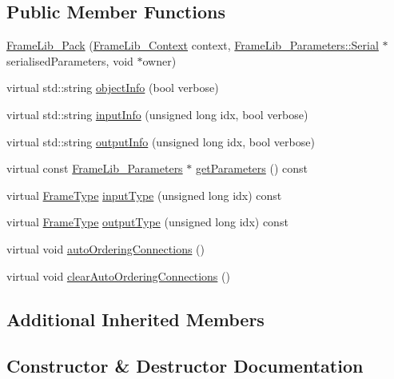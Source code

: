 \subsection*{Public Member Functions}
\begin{DoxyCompactItemize}
\item 
\hyperlink{class_frame_lib___pack_aded2a9815261f73a8231f5df6c647ac2}{Frame\+Lib\+\_\+\+Pack} (\hyperlink{class_frame_lib___context}{Frame\+Lib\+\_\+\+Context} context, \hyperlink{class_frame_lib___parameters_1_1_serial}{Frame\+Lib\+\_\+\+Parameters\+::\+Serial} $\ast$serialised\+Parameters, void $\ast$owner)
\item 
virtual std\+::string \hyperlink{class_frame_lib___pack_aa15c5f54847d99c3bd3f9c2cf7688fd2}{object\+Info} (bool verbose)
\item 
virtual std\+::string \hyperlink{class_frame_lib___pack_ae9dacf16825332c2227cd9fd9af9db1d}{input\+Info} (unsigned long idx, bool verbose)
\item 
virtual std\+::string \hyperlink{class_frame_lib___pack_a40e71debefbc3e5e507e4f494e9efd68}{output\+Info} (unsigned long idx, bool verbose)
\item 
virtual const \hyperlink{class_frame_lib___parameters}{Frame\+Lib\+\_\+\+Parameters} $\ast$ \hyperlink{class_frame_lib___pack_af3f27c6065dc2e5c8106de50c42d63c3}{get\+Parameters} () const
\item 
virtual \hyperlink{_frame_lib___types_8h_ad495a9f61af7fff07d7e97979d1ab854}{Frame\+Type} \hyperlink{class_frame_lib___pack_af516c48cb7d0e685c6572dbdd1377b66}{input\+Type} (unsigned long idx) const
\item 
virtual \hyperlink{_frame_lib___types_8h_ad495a9f61af7fff07d7e97979d1ab854}{Frame\+Type} \hyperlink{class_frame_lib___pack_a48e9118d038396653928116b5c69077f}{output\+Type} (unsigned long idx) const
\item 
virtual void \hyperlink{class_frame_lib___pack_aacf276d3ed114e4aa03b8e640164d116}{auto\+Ordering\+Connections} ()
\item 
virtual void \hyperlink{class_frame_lib___pack_af0b40307726462df7754ead87c7c8a9c}{clear\+Auto\+Ordering\+Connections} ()
\end{DoxyCompactItemize}
\subsection*{Additional Inherited Members}


\subsection{Constructor \& Destructor Documentation}
\mbox{\label{class_frame_lib___pack_aded2a9815261f73a8231f5df6c647ac2}} 
